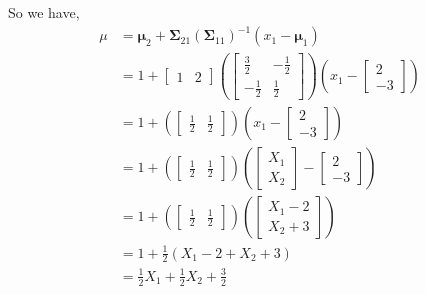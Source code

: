 \documentclass[12pt]{article}\usepackage[]{graphicx}\usepackage[]{color}
\newcommand{\vct}{\mathbf}
\begin{document}
\begin{enumerate}[a)]
So we have,
\begin{align*}
\mu &= \vct{\mu}_2 + \vct{\Sigma}_{21}(\vct{\Sigma}_{11})^{-1}(x_1 - \vct{\mu}_1)\\
&= 1 + \begin{bmatrix} 1 & 2 \end{bmatrix}\left(\begin{bmatrix} \frac{3}{2} & -\frac{1}{2} \\ -\frac{1}{2} & \frac{1}{2} \end{bmatrix}\right)(x_1 - \begin{bmatrix} 2 \\ -3 \end{bmatrix})\\
&= 1 + \left(\begin{bmatrix} \frac{1}{2} & \frac{1}{2} \end{bmatrix}\right)(x_1 - \begin{bmatrix} 2 \\ -3 \end{bmatrix})\\
&= 1 + \left(\begin{bmatrix} \frac{1}{2} & \frac{1}{2} \end{bmatrix}\right)\left(\begin{bmatrix} X_1 \\ X_2 \end{bmatrix} - \begin{bmatrix} 2 \\ -3 \end{bmatrix}\right)\\
&= 1 + \left(\begin{bmatrix} \frac{1}{2} & \frac{1}{2} \end{bmatrix}\right)\left(\begin{bmatrix} X_1 - 2 \\ X_2 + 3 \end{bmatrix}\right)\\
&= 1 + \frac{1}{2}\left(X_1 - 2 + X_2 + 3\right)\\
&= \frac{1}{2}X_1 + \frac{1}{2}X_2 + \frac{3}{2}
\end{align*}


\end{enumerate}
\end{document}
